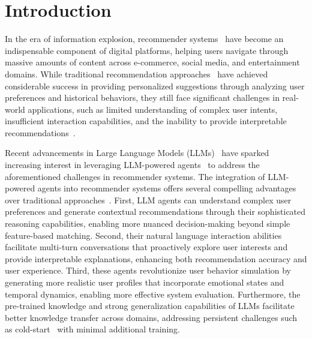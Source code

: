 \section{Introduction}

In the era of information explosion, recommender systems~\cite{wu2022survey} have become an indispensable component of digital platforms, helping users navigate through massive amounts of content across e-commerce, social media, and entertainment domains. 
While traditional recommendation approaches~\cite{he2017neural} have achieved considerable success in providing personalized suggestions through analyzing user preferences and historical behaviors, they still face significant challenges in real-world applications, such as limited understanding of complex user intents, insufficient interaction capabilities, and the inability to provide interpretable recommendations~\cite{zhu2024recommender}.


Recent advancements in Large Language Models (LLMs)~\cite{achiam2023gpt} have sparked increasing interest in leveraging LLM-powered agents~\cite{wang2024survey} to address the aforementioned challenges in recommender systems. 
The integration of LLM-powered agents into recommender systems offers several compelling advantages over traditional approaches~\cite{zhu2024recommender}. 
First, LLM agents can understand complex user preferences and generate contextual recommendations through their sophisticated reasoning capabilities, enabling more nuanced decision-making beyond simple feature-based matching. 
Second, their natural language interaction abilities facilitate multi-turn conversations that proactively explore user interests and provide interpretable explanations, enhancing both recommendation accuracy and user experience. 
Third, these agents revolutionize user behavior simulation by generating more realistic user profiles that incorporate emotional states and temporal dynamics, enabling more effective system evaluation. Furthermore, the pre-trained knowledge and strong generalization capabilities of LLMs facilitate better knowledge transfer across domains, addressing persistent challenges such as cold-start~\cite{shu2024rah} with minimal additional training.



